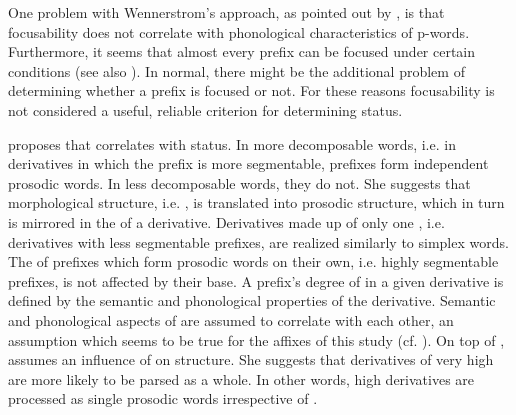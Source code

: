 One problem with Wennerstrom's approach, as pointed out by \citet[161 f.]{Raffelsiefen.1999}, is that focusability does not correlate with phonological characteristics of p-words. Furthermore, it seems that almost every prefix can be focused under certain conditions (see also \citealt[chapter 4]{Plag.2003}). In normal,  there might be the additional problem of determining whether a prefix is focused or not. For these reasons focusability is not considered a useful, reliable criterion for determining  status.

\cite{Raffelsiefen.1999} proposes that  correlates with  status. In more decomposable words, i.e. in derivatives in which the prefix is more segmentable, prefixes form independent prosodic words. In less decomposable words, they do not.
She suggests that morphological structure, i.e. , is translated into prosodic structure, which in turn is mirrored in the  of a derivative. Derivatives made up of only one , i.e. derivatives with less segmentable prefixes, are realized similarly to simplex words. The  of prefixes which form prosodic words on their own, i.e. highly segmentable prefixes, is not affected by their base. 
A prefix's degree of  in a given derivative is defined by the semantic and phonological properties of the derivative. 
Semantic and phonological aspects of  are assumed to correlate with each other, an assumption which seems to be true for the affixes of this study (cf. ). On top of , \citet[175 f.]{Raffelsiefen.1999} assumes an influence of  on  structure. 
She suggests that derivatives of very high  are more likely to be parsed as a whole. In other words, high  derivatives are processed as single prosodic words irrespective of .


